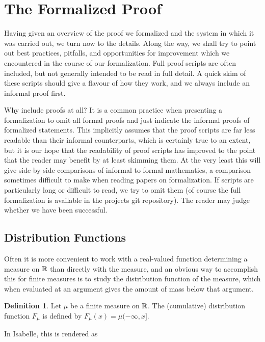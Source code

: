 \documentclass{article}
\theoremstyle{definition}
\newtheorem{definition}[theorem]{Definition}
\begin{document}
\section{The Formalized Proof} \label{sec:form}

Having given an overview of the proof we formalized and the system in which it was carried out, we turn now to the details. Along the way, we shall try to point out best practices, pitfalls, and opportunities for improvement which we encountered in the course of our formalization. Full proof scripts are often included, but not generally intended to be read in full detail. A quick skim of these scripts should give a flavour of how they work, and we always include an informal proof first.

Why include proofs at all? It is a common practice when presenting a formalization to omit all formal proofs and just indicate the informal proofs of formalized statements. This implicitly assumes that the proof scripts are far less readable than their informal counterparts, which is certainly true to an extent, but it is our hope that the readability of proof scripts has improved to the point that the reader may benefit by at least skimming them. At the very least this will give side-by-side comparisons of informal to formal mathematics, a comparison sometimes difficult to make when reading papers on formalization. If scripts are particularly long or difficult to read, we try to omit them (of course the full formalization is available in the projects git repository). The reader may judge whether we have been successful.

\subsection{Distribution Functions} \label{sec:cdf}

Often it is more convenient to work with a real-valued function determining a measure on $\mathbb{R}$ than directly with the measure, and an obvious way to accomplish this for finite measures is to study the distribution function of the measure, which when evaluated at an argument gives the amount of mass below that argument.

\begin{definition}
Let $\mu$ be a finite measure on $\mathbb{R}$. The (cumulative) distribution function $F_\mu$ is defined by $F_\mu(x) = \mu (-\infty, x]$.
\end{definition}

In Isabelle, this is rendered as
\end{document}
